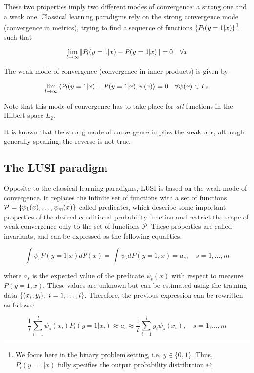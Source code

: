 These two properties imply two different modes of convergence: a strong one and a weak one. Classical
learning paradigms rely on the strong convergence mode (convergence in metrics), trying to find a
sequence of functions $\lbrace P_l(y=1 | x) \rbrace$\footnote{We focus here in the binary problem setting, i.e. $y\in \{0,1\}$. Thus, $P_l(y=1 | x)$ fully specifies the output probability distribution.} such that

\[
    \lim_{l \to \infty} \lVert P_l(y=1 | x) - P(y=1 | x) \rVert = 0\quad \forall x
\]

The weak mode of convergence (convergence in inner products) is given by

\[
    \lim_{l \to \infty} \left< P_l(y=1 | x) - P(y=1 | x), \psi(x) \right> = 0\quad \forall \psi(x) \in L_2
\]

Note that this mode of convergence has to take place for \emph{all} functions in the Hilbert space $L_2$.

It is known that the strong mode of convergence implies the weak one, although generally speaking, the
reverse is not true.

\subsection{The LUSI paradigm}

Opposite to the classical learning paradigms, LUSI is based on the weak mode of convergence. It replaces
the infinite set of functions with a set of functions $\mathcal{P} = \lbrace \psi_1(x), \dots, \psi_m(x) \rbrace$
called predicates, which describe some important properties of the desired conditional probability function and
restrict the scope of weak convergence only to the set of functions $\mathcal{P}$. These properties are
called invariants, and can be expressed as the following equalities:

\[
    \int \psi_s P(y=1 | x)dP(x) = \int \psi_s dP(y=1, x) = a_s,\quad s = 1, \dots, m
\]

where $a_s$ is the expected value of the predicate $\psi_s(x)$ with respect to measure
$P(y=1, x)$. These values are unknown but can be estimated using the training data
$\lbrace (x_i, y_i),\ i = 1, \dots, l \rbrace$. Therefore, the previous expression can be rewritten
as follows:

\begin{equation}
    \label{eq:invariant_approximation}
    \frac{1}{l} \sum_{i=1}^l \psi_s(x_i)P_l(y=1 | x_i) \approx a_s \approx \frac{1}{l} \sum_{i=1}^l y_i \psi_s(x_i),\quad
    s = 1, \dots, m
\end{equation}

